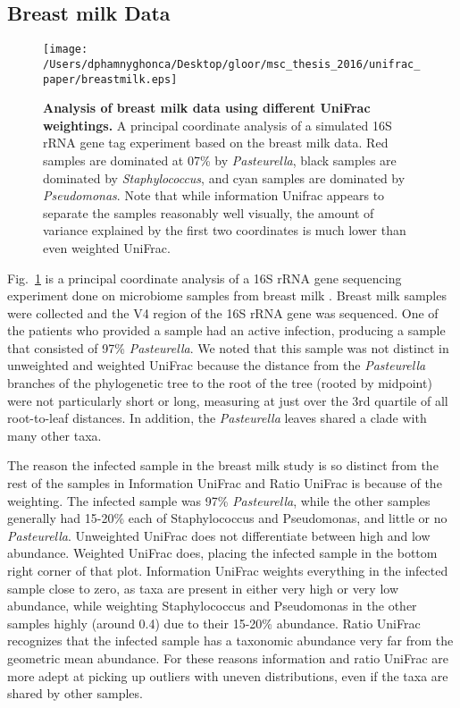 \documentclass[10pt,letterpaper]{article}
\begin{document}
\FloatBarrier

\subsection{Breast milk Data}

\begin{figure}[h]
\texttt{[image: /Users/dphamnyghonca/Desktop/gloor/msc\_thesis\_2016/unifrac\_paper/breastmilk.eps]}
\caption[Analysis of breast milk data using different UniFrac weightings.]{{\bf Analysis of breast milk data using different UniFrac weightings. }
A principal coordinate analysis of a simulated 16S rRNA gene tag experiment based on the breast milk data. Red samples are dominated at 07\% by \textit{Pasteurella}, black samples are dominated by \textit{Staphylococcus}, and cyan samples are dominated by \textit{Pseudomonas}. Note that while information Unifrac appears to separate the samples reasonably well visually, the amount of variance explained by the first two coordinates is much lower than even weighted UniFrac.}
\label{fig7}
\end{figure}

Fig.~\ref{fig7} is a principal coordinate analysis of a 16S rRNA gene sequencing experiment done on microbiome samples from breast milk \cite{urbaniak2016human}. Breast milk samples were collected and the V4 region of the 16S rRNA gene was sequenced. One of the patients who provided a sample had an active infection, producing a sample that consisted of 97\% \textit{Pasteurella}. We noted that this sample was not distinct in unweighted and weighted UniFrac because the distance from the \textit{Pasteurella} branches of the phylogenetic tree to the root of the tree (rooted by midpoint) were not particularly short or long, measuring at just over the 3rd quartile of all root-to-leaf distances. In addition, the \textit{Pasteurella} leaves shared a clade with many other taxa.

The reason the infected sample in the breast milk study is so distinct from the rest of the samples in Information UniFrac and Ratio UniFrac is because of the weighting. The infected sample was 97\% \textit{Pasteurella}, while the other samples generally had 15-20\% each of Staphylococcus and Pseudomonas, and little or no \textit{Pasteurella}. Unweighted UniFrac does not differentiate between high and low abundance. Weighted UniFrac does, placing the infected sample in the bottom right corner of that plot. Information UniFrac weights everything in the infected sample close to zero, as taxa are present in either very high or very low abundance, while weighting Staphylococcus and Pseudomonas in the other samples highly (around 0.4) due to their 15-20\% abundance. Ratio UniFrac recognizes that the infected sample has a taxonomic abundance very far from the geometric mean abundance. For these reasons information and ratio UniFrac are more adept at picking up outliers with uneven distributions, even if the taxa are shared by other samples.
\end{document}
